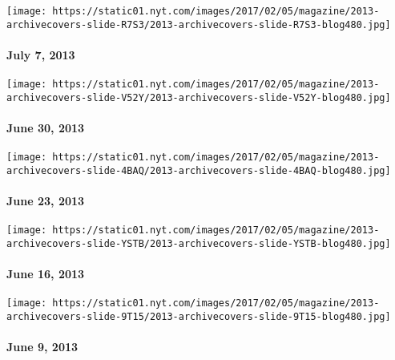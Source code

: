 \texttt{[image: https://static01.nyt.com/images/2017/02/05/magazine/2013-archivecovers-slide-R7S3/2013-archivecovers-slide-R7S3-blog480.jpg]}

\hypertarget{july-7-2013}{%
\paragraph{July 7, 2013}\label{july-7-2013}}

\href{http://www.nytimes.com/indexes/2013/06/30/magazine/index.html}{}

\texttt{[image: https://static01.nyt.com/images/2017/02/05/magazine/2013-archivecovers-slide-V52Y/2013-archivecovers-slide-V52Y-blog480.jpg]}

\hypertarget{june-30-2013}{%
\paragraph{June 30, 2013}\label{june-30-2013}}

\href{http://www.nytimes.com/indexes/2013/06/23/magazine/index.html}{}

\texttt{[image: https://static01.nyt.com/images/2017/02/05/magazine/2013-archivecovers-slide-4BAQ/2013-archivecovers-slide-4BAQ-blog480.jpg]}

\hypertarget{june-23-2013}{%
\paragraph{June 23, 2013}\label{june-23-2013}}

\href{http://www.nytimes.com/indexes/2013/06/16/magazine/index.html}{}

\texttt{[image: https://static01.nyt.com/images/2017/02/05/magazine/2013-archivecovers-slide-YSTB/2013-archivecovers-slide-YSTB-blog480.jpg]}

\hypertarget{june-16-2013}{%
\paragraph{June 16, 2013}\label{june-16-2013}}

\href{http://www.nytimes.com/indexes/2013/06/09/magazine/index.html}{}

\texttt{[image: https://static01.nyt.com/images/2017/02/05/magazine/2013-archivecovers-slide-9T15/2013-archivecovers-slide-9T15-blog480.jpg]}

\hypertarget{june-9-2013}{%
\paragraph{June 9, 2013}\label{june-9-2013}}


